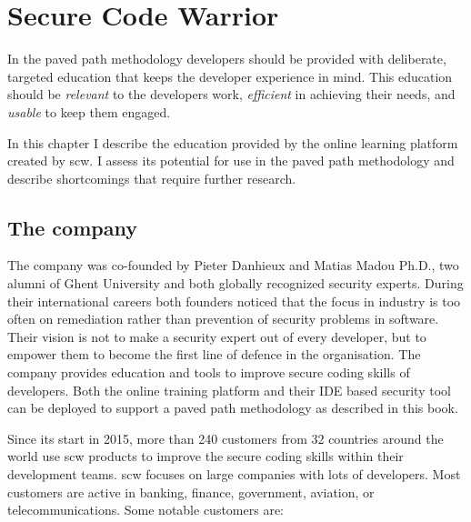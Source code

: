 \chapter{Secure Code Warrior}
\label{ch:scw}
\glsresetall

In the paved path methodology developers should be provided with deliberate, targeted education that keeps the developer experience in mind.
This education should be \textit{relevant} to the developers work, \textit{efficient} in achieving their needs, and \textit{usable} to keep them engaged.

In this chapter I describe the education provided by the online learning platform created by \gls{scw}. 
I assess its potential for use in the paved path methodology and describe shortcomings that require further research.



\section{The company}
The company was co-founded by Pieter Danhieux and Matias Madou Ph.D., two alumni of Ghent University and both globally recognized security experts.
During their international careers both founders noticed that the focus in industry is too often on remediation rather than prevention of \glspl{security problem} in software.
Their vision is not to make a security expert out of every developer, but to empower them to become the first line of defence in the organisation.
The company provides education and tools to improve secure coding skills of developers.
Both the online training platform and their IDE based security tool can be deployed to support a paved path methodology as described in this book.

Since its start in 2015, more than 240 customers from 32 countries around the world use \gls{scw} products to improve the secure coding skills within their development teams.
\Gls{scw} focuses on large companies with lots of developers. Most customers are active in banking, finance, government, aviation, or telecommunications. Some notable customers are:

